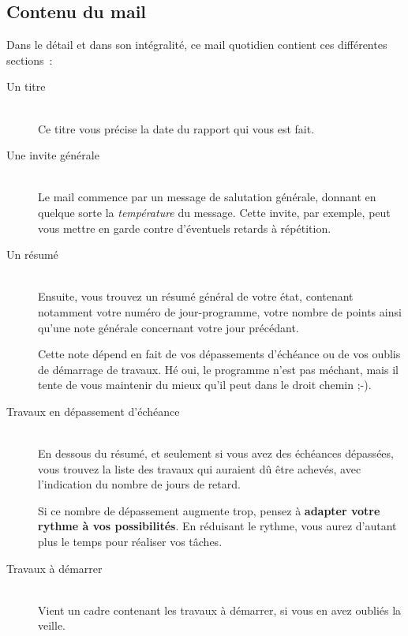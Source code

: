 \subsection{Contenu du mail}\hypertarget{contenu-du-mail}{}\label{contenu-du-mail}

Dans le détail et dans son intégralité, ce mail quotidien contient ces différentes sections~{}:

\begin{description}
\item[Un titre] \hfill \\
 Ce titre vous précise la date du rapport qui vous est fait.



\item[Une invite générale] \hfill \\
 Le mail commence par un message de salutation générale, donnant en quelque sorte la \emph{température} du message. Cette invite, par exemple, peut vous mettre en garde contre d'éventuels retards à répétition.



\item[Un résumé] \hfill \\
 Ensuite, vous trouvez un résumé général de votre état, contenant notamment votre numéro de jour-programme, votre nombre de points ainsi qu'une note générale concernant votre jour précédant.



Cette note dépend en fait de vos dépassements d'échéance ou de vos oublis de démarrage de travaux. Hé oui, le programme n'est pas méchant, mais il tente de vous maintenir du mieux qu'il peut dans le droit chemin ;-).



\item[Travaux en dépassement d'échéance] \hfill \\
 En dessous du résumé, et seulement si vous avez des échéances dépassées, vous trouvez la liste des travaux qui auraient dû être achevés, avec l'indication du nombre de jours de retard.



Si ce nombre de dépassement augmente trop, pensez à \textbf{adapter votre rythme à vos possibilités}. En réduisant le rythme, vous aurez d'autant plus le temps pour réaliser vos tâches.



\item[Travaux à démarrer] \hfill \\
 Vient un cadre contenant les travaux à démarrer, si vous en avez oubliés la veille.




\end{description}
